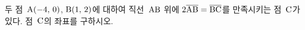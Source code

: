 두 점~$\mathrm{A}(-4,\mkern3mu 0)$, $\mathrm{B}(1,\mkern3mu 2)$에 대하여 직선~$\mathrm{AB}$ 위에 $2\overline{\mathrm{AB}}=\overline{\mathrm{BC}}$를 만족시키는 점~$\mathrm{C}$가 있다. 점~$\mathrm{C}$의 좌표를 구하시오. 
